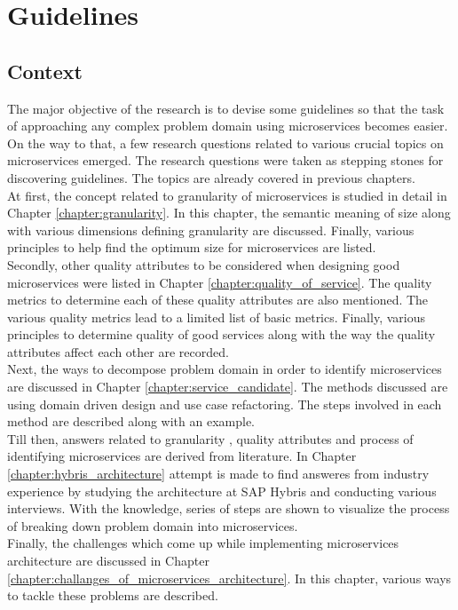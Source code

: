 \chapter{Guidelines}\label{chapter:guidelines}
\section{Context}\label{section:guidelines/context}
The major objective of the research is to devise some guidelines so that the task of approaching any complex problem domain using microservices becomes easier. On the way to that, a few research questions related to various crucial topics on microservices emerged. The research questions were taken as stepping stones for discovering guidelines. The topics are already covered in previous chapters. 
\\
At first, the concept related to granularity of microservices is studied in detail in Chapter \ref{chapter:granularity}. In this chapter, the semantic meaning of size along with various dimensions defining granularity are discussed. Finally, various principles to help find the optimum size for microservices are listed.
\\
Secondly, other quality attributes to be considered when designing good microservices were listed in Chapter \ref{chapter:quality_of_service}. The quality metrics to determine each of these quality attributes are also mentioned. The various quality metrics lead to a limited list of basic metrics. Finally, various principles to determine quality of good services along with the way the quality attributes affect each other are recorded.
\\
Next, the ways to decompose problem domain in order to identify microservices are discussed in Chapter \ref{chapter:service_candidate}. The methods discussed are using domain driven design and use case refactoring. The steps involved in each method are described along with an example.
\\
Till then, answers related to granularity , quality attributes and process of identifying microservices are derived from literature. In Chapter \ref{chapter:hybris_architecture} attempt is made to find answeres from industry experience by studying the architecture at SAP Hybris and conducting various interviews. With the knowledge, series of steps are shown to visualize the process of breaking down problem domain into microservices.
\\
Finally, the challenges which come up while implementing microservices architecture are discussed in Chapter \ref{chapter:challanges_of_microservices_architecture}. In this chapter, various ways to tackle these problems are described.

